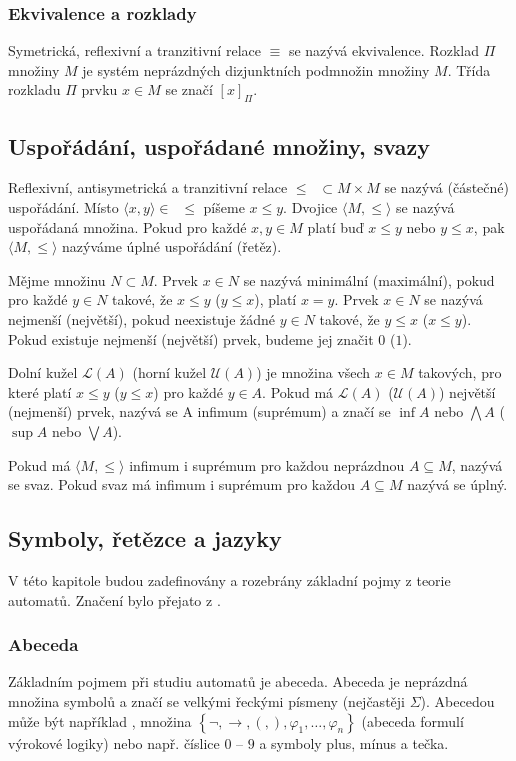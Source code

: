 \documentclass[a4paper,10pt]{article}
\begin{document}
\subsubsection*{Ekvivalence a rozklady}
Symetrická, reflexivní a tranzitivní relace $\equiv$ se nazývá ekvivalence. Rozklad $\Pi$ množiny $M$ je systém neprázdných dizjunktních podmnožin množiny $M$. Třída rozkladu $\Pi$ prvku $x \in M$ se značí $\left[ x \right]_\Pi$.

\subsection{Uspořádání, uspořádané množiny, svazy}
Reflexivní, antisymetrická a tranzitivní relace $\leq \;\; \subset M \times M$ se nazývá (částečné) uspořádání. Místo $\langle x, y\rangle \in \;\; \leq$ píšeme $x \leq y$. Dvojice $\langle M, \leq \rangle$ se nazývá uspořádaná množina. Pokud pro každé $x, y \in M$ platí buď $x \leq y$ nebo $y \leq x$, pak $\langle M, \leq \rangle$ nazýváme úplné uspořádání (řetěz).

Mějme množinu $N \subset M$. Prvek $x \in N$ se nazývá minimální (maximální), pokud pro každé $y \in N$ takové, že $x \leq y$ ($y \leq x$), platí $x = y$. Prvek $x \in N$ se nazývá nejmenší (největší), pokud neexistuje žádné $y \in N$ takové, že $y \leq x$ ($x \leq y$). Pokud existuje nejmenší (největší) prvek, budeme jej značit $0$ ($1$).

Dolní kužel $\mathcal{L}(A)$ (horní kužel $\mathcal{U}(A)$) je množina všech $x \in M$ takových, pro které platí $x \leq y$ ($y \leq x$) pro každé $y \in A$. Pokud má $\mathcal{L}(A)$ ($\mathcal{U}(A)$) největší (nejmenší) prvek, nazývá se A infimum (suprémum) a značí se $\inf A$ nebo $\bigwedge A$ ($\sup A$ nebo $\bigvee A$).

Pokud má $\langle M, \leq \rangle$ infimum i suprémum pro každou neprázdnou $A \subseteq M$, nazývá se svaz. Pokud svaz má infimum i suprémum pro každou $A \subseteq M$ nazývá se úplný. 



\subsection{Symboly, řetězce a jazyky}
 V této kapitole budou zadefinovány a rozebrány základní pojmy z teorie automatů. Značení bylo přejato z \cite{kozen-automata-and-computability}. 

\subsubsection*{Abeceda}
Základním pojmem při studiu automatů je abeceda. Abeceda je neprázdná množina symbolů a značí se velkými řeckými písmeny (nejčastěji $\Sigma$). Abecedou může být například , množina $\left\{\neg, \rightarrow, (, ), \varphi_1, \dots, \varphi_n \right\}$ (abeceda formulí výrokové logiky) nebo např. číslice $0$ -- $9$ a symboly plus, mínus a tečka.  
\end{document}
